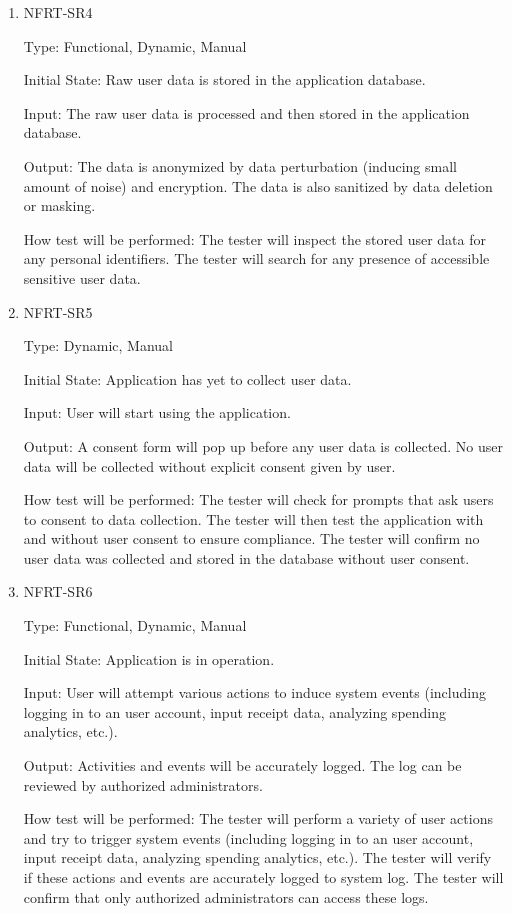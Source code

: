 \documentclass[12pt, titlepage]{article}
\begin{document}
\begin{enumerate}
\item{NFRT-SR4\\}

Type: Functional, Dynamic, Manual

Initial State: Raw user data is stored in the application database.
                
Input: The raw user data is processed and then stored in the application database.
                
Output: The data is anonymized by data perturbation (inducing small amount of noise) and encryption. The data is also sanitized by data deletion or masking.
                
How test will be performed: The tester will inspect the stored user data for any personal identifiers. The tester will search for any presence of accessible sensitive user data.

\item{NFRT-SR5\\}

Type: Dynamic, Manual

Initial State: Application has yet to collect user data.
                
Input: User will start using the application.
                
Output: A consent form will pop up before any user data is collected. No user data will be collected without explicit consent given by user.
                
How test will be performed: The tester will check for prompts that ask users to consent to data collection. The tester will then test the application with and without user consent to ensure compliance. The tester will confirm no user data was collected and stored in the database without user consent.

\item{NFRT-SR6\\}

Type: Functional, Dynamic, Manual

Initial State: Application is in operation.
                
Input: User will attempt various actions to induce system events (including logging in to an user account, input receipt data, analyzing spending analytics, etc.).
                
Output: Activities and events will be accurately logged. The log can be reviewed by authorized administrators.
                
How test will be performed: The tester will perform a variety of user actions and try to trigger system events (including logging in to an user account, input receipt data, analyzing spending analytics, etc.). The tester will verify if these actions and events are accurately logged to system log. The tester will confirm that only authorized administrators can access these logs.

\end{enumerate}
\end{document}
